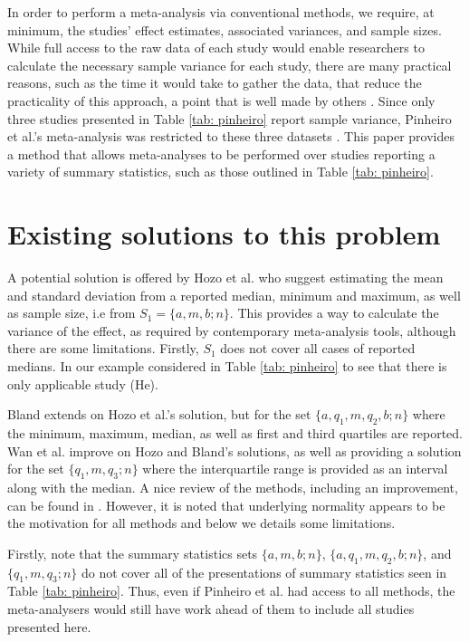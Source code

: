 \documentclass{article}
\begin{document}
In order to perform a meta-analysis via conventional methods, we require, at minimum, the studies' effect estimates, associated variances, and sample sizes. While full access to the raw data of each study would enable researchers to calculate the necessary sample variance for each study, there are many practical reasons, such as the time it would take to gather the data, that reduce the practicality of this approach, a point that is well made by others \cite[e.g., p. 57]{Bland2015}.   Since only three studies presented in Table \ref{tab: pinheiro} report sample variance, Pinheiro et al.'s meta-analysis was restricted to these three datasets \cite{Pinheiro2012}. This paper provides a method that allows meta-analyses to be performed over studies reporting a variety of summary statistics, such as those outlined in Table \ref{tab: pinheiro}.

\section{Existing solutions to this problem} \label{sec: prev methods}


A potential solution is offered by Hozo et al. \cite{Hozo2005} who suggest estimating the mean and standard deviation from a reported median, minimum and maximum, as well as sample size, i.e from $S_1=\{a, m, b; n\}$. This provides a way to calculate the variance of the effect, as required by contemporary meta-analysis tools, although there are some limitations. Firstly, $S_1$ does not cover all cases of reported medians. In our example considered in Table \ref{tab: pinheiro} to see that there is only applicable study (He).

Bland extends on Hozo et al.'s solution, but for the set $\{a, q_1, m, q_2, b; n\}$ where the minimum, maximum, median, as well as first and third quartiles are reported\cite{Bland2015}. Wan et al. improve on Hozo and Bland's solutions, as well as providing a solution for the set $\{q_1, m, q_3; n\}$ where the interquartile range is provided as an interval along with the median\cite{Wan2014}.  A nice review of the methods, including an improvement, can be found in \cite{shi2018estimate}.  However, it is noted that underlying normality appears to be the motivation for all methods and below we details some limitations.

Firstly, note that the summary statistics sets $\{a, m, b; n\}$, $\{a, q_1, m, q_2, b; n\}$, and $\{q_1, m, q_3; n\}$ do not cover all of the presentations of summary statistics seen in Table \ref{tab: pinheiro}. Thus, even if Pinheiro et al. had access to all methods, the meta-analysers would still have work ahead of them to include all studies presented here.
\end{document}
